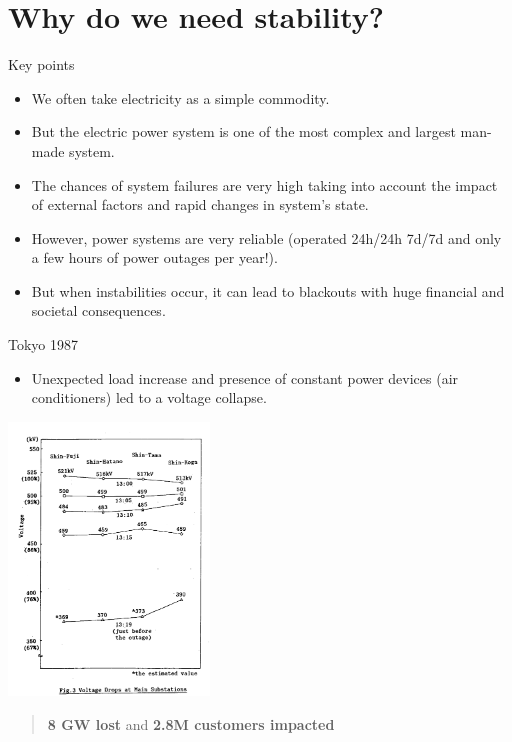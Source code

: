 \section{Why do we need stability?}

\begin{frame} {Key points}
\begin{itemize}
    \item We often take electricity as a simple commodity.
    \item But the electric power system is one of the most complex and largest man-made system.
    \item The chances of system failures are very high taking into account the impact of external factors and rapid changes in system's state.
    \item However, power systems are very reliable (operated 24h/24h 7d/7d and only a few hours of power outages per year!).
    \item But when instabilities occur, it can lead to blackouts with huge financial and societal consequences.
\end{itemize}
\end{frame}

\begin{frame}{Tokyo 1987}
\begin{itemize}
    \item Unexpected load increase and presence of constant power devices (air conditioners) led to a voltage collapse.
\end{itemize}
\vspace{0.5cm}
\begin{center}
\includegraphics[width=0.4\textwidth]{images/TokyoCollapse.png}
\end{center}
\vspace{0.5cm}
\begin{quote}
    \textbf{8 GW lost} and \textbf{2.8M customers impacted} \cite{ohno2006tokyo, kurita1988power}
\end{quote}
\end{frame}

